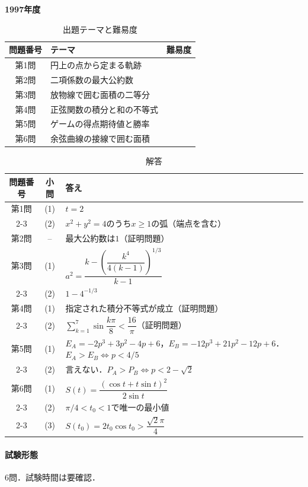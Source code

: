 \documentclass[../../main.tex]{subfiles}
\begin{document}
\begin{center}
  {\fontsize{48pt}{58pt}\selectfont \textbf{1997}\normalsize\textbf{年度}}
\end{center}

\begin{table}[htb]
  \centering
  \caption{出題テーマと難易度}
  \begin{tabular}{|c|p{9cm}|c|}
    \hline
    \textbf{問題番号} & \textbf{テーマ} & \textbf{難易度} \\
    \hline
    第1問 & 円上の点から定まる軌跡 & \\
    \hline
    第2問 & 二項係数の最大公約数 & \\
    \hline
    第3問 & 放物線で囲む面積の二等分 & \\
    \hline
    第4問 & 正弦関数の積分と和の不等式 & \\
    \hline
    第5問 & ゲームの得点期待値と勝率 & \\
    \hline
    第6問 & 余弦曲線の接線で囲む面積 & \\
    \hline
  \end{tabular}
\end{table}

\begin{table}[htb]
  \centering
  \caption{解答}
  \renewcommand{\arraystretch}{1.4}
  \begin{tabular}{|c|c|p{9cm}|}
    \hline
    \textbf{問題番号} & \textbf{小問} & \textbf{答え} \\
    \hline
    第1問 & (1) & $t=2$ \\
    \cline{2-3}
    & (2) & $x^2+y^2=4$のうち$x\ge1$の弧（端点を含む） \\
    \hline
    第2問 & -- & 最大公約数は$1$（証明問題） \\
    \hline
    第3問 & (1) & $a^2=\dfrac{k-\left(\dfrac{k^4}{4(k-1)}\right)^{1/3}}{k-1}$ \\
    \cline{2-3}
    & (2) & $1-4^{-1/3}$ \\
    \hline
    第4問 & (1) & 指定された積分不等式が成立（証明問題） \\
    \cline{2-3}
    & (2) & $\sum_{k=1}^7\sin\dfrac{k\pi}{8}<\dfrac{16}{\pi}$（証明問題） \\
    \hline
    第5問 & (1) & $E_A=-2p^3+3p^2-4p+6$，$E_B=-12p^3+21p^2-12p+6$．$E_A>E_B\iff p<4/5$ \\
    \cline{2-3}
    & (2) & 言えない．$P_A>P_B\iff p<2-\sqrt{2}$ \\
    \hline
    第6問 & (1) & $S(t)=\dfrac{(\cos t+t\sin t)^2}{2\sin t}$ \\
    \cline{2-3}
    & (2) & $\pi/4<t_0<1$で唯一の最小値 \\
    \cline{2-3}
    & (3) & $S(t_0)=2t_0\cos t_0>\dfrac{\sqrt{2}\pi}{4}$ \\
    \hline
  \end{tabular}
\end{table}

\paragraph{試験形態}
6問．試験時間は要確認．
\end{document}
